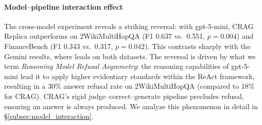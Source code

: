 \begin{table}[t]
\centering
\caption{Cross-model validation (RQ1, gpt-5-mini). $n = 200$ per dataset (FinanceBench: $n = 150$). LLM-as-Judge: gpt-4.1-nano (same independent judge as Gemini experiments). Best per dataset in \textbf{bold}.}
\label{tab:rq1_crossmodel}
\end{table}

\paragraph{Model--pipeline interaction effect}
The cross-model experiment reveals a striking reversal: with gpt-5-mini, CRAG Replica outperforms \ours{} on 2WikiMultiHopQA (F1 0.637 vs.\ 0.551, $p = 0.004$) and FinanceBench (F1 0.343 vs.\ 0.317, $p = 0.042$).
This contrasts sharply with the Gemini results, where \ours{} leads on both datasets.
The reversal is driven by what we term \emph{Reasoning Model Refusal Asymmetry}: the reasoning capabilities of gpt-5-mini lead it to apply higher evidentiary standards within the ReAct framework, resulting in a 30\% answer refusal rate on 2WikiMultiHopQA (compared to 18\% for CRAG).
CRAG's rigid judge--correct--generate pipeline precludes refusal, ensuring an answer is always produced.
We analyze this phenomenon in detail in \S\ref{subsec:model_interaction}.

